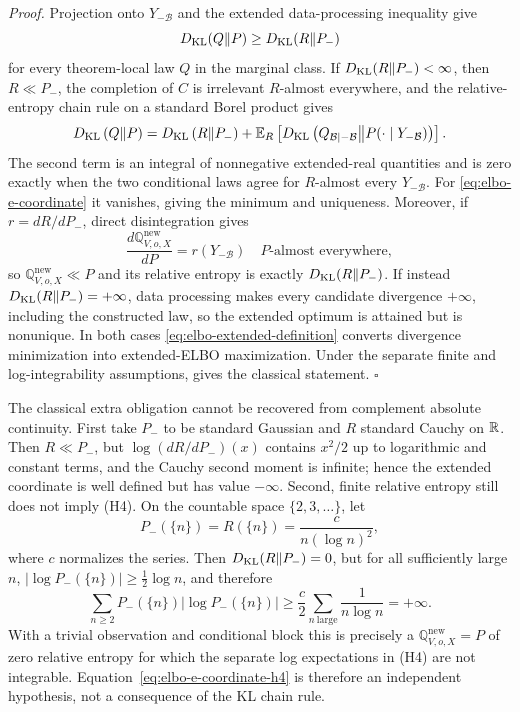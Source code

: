 \emph{Proof.} Projection onto $Y_{-\mathcal B}$ and the extended data-processing inequality give
\[
D_{\mathrm{KL}}(Q\Vert P)\geq D_{\mathrm{KL}}(R\Vert P_-)
\]
for every theorem-local law \(Q\) in the marginal class. If \(D_{\mathrm{KL}}(R\Vert P_-)<\infty\), then \(R\ll P_-\), the completion of \(C\) is irrelevant \(R\)-almost everywhere, and the relative-entropy chain rule on a standard Borel product gives
\begin{equation}
D_{\mathrm{KL}}\left(Q\middle\Vert P\right)
=D_{\mathrm{KL}}\left(R\middle\Vert P_-\right)
+\mathbb E_{R}
\left[
D_{\mathrm{KL}}\left(
Q_{\mathcal B\mid-\mathcal B}
\middle\Vert
P(\cdot\mid Y_{-\mathcal B})
\right)
\right].
\label{eq:elbo-kl-chain-rule}
\end{equation}
The second term is an integral of nonnegative extended-real quantities and is zero exactly when the two conditional laws agree for \(R\)-almost every \(Y_{-\mathcal B}\). For \eqref{eq:elbo-e-coordinate} it vanishes, giving the minimum and uniqueness. Moreover, if \(r=dR/dP_-\), direct disintegration gives
\[
\frac{d\mathbb Q_{V,o,X}^{\mathrm{new}}}{dP}
=r(Y_{-\mathcal B})
\quad P\text{-almost everywhere},
\]
so \(\mathbb Q_{V,o,X}^{\mathrm{new}}\ll P\) and its relative entropy is exactly \(D_{\mathrm{KL}}(R\Vert P_-)\). If instead \(D_{\mathrm{KL}}(R\Vert P_-)=+\infty\), data processing makes every candidate divergence \(+\infty\), including the constructed law, so the extended optimum is attained but is nonunique. In both cases \eqref{eq:elbo-extended-definition} converts divergence minimization into extended-ELBO maximization. Under the separate finite and log-integrability assumptions,  gives the classical statement. \hfill\(\square\)

The classical extra obligation cannot be recovered from complement absolute continuity. First take \(P_-\) to be standard Gaussian and \(R\) standard Cauchy on \(\mathbb R\). Then \(R\ll P_-\), but \(\log(dR/dP_-)(x)\) contains \(x^2/2\) up to logarithmic and constant terms, and the Cauchy second moment is infinite; hence the extended coordinate is well defined but has value $-\infty$. Second, finite relative entropy still does not imply (H4). On the countable space \(\{2,3,\ldots\}\), let
\[
P_-(\{n\})=R(\{n\})
=\frac{c}{n(\log n)^2},
\]
where \(c\) normalizes the series. Then \(D_{\mathrm{KL}}(R\Vert P_-)=0\), but for all sufficiently large \(n\), \(\left|\log P_-(\{n\})\right|\geq\tfrac12\log n\), and therefore
\[
\sum_{n\geq2}P_-(\{n\})
\left|\log P_-(\{n\})\right|
\geq
\frac{c}{2}\sum_{n\ \mathrm{large}}\frac{1}{n\log n}
=+\infty.
\]
With a trivial observation and conditional block this is precisely a \(\mathbb Q_{V,o,X}^{\mathrm{new}}=P\) of zero relative entropy for which the separate log expectations in (H4) are not integrable. Equation~\eqref{eq:elbo-e-coordinate-h4} is therefore an independent hypothesis, not a consequence of the KL chain rule.

